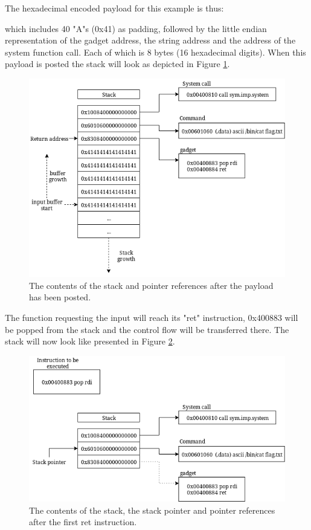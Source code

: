 \begin{enumerate}
The hexadecimal encoded payload for this example is thus:


which includes 40 "A"s (0x41) as padding, followed by the little endian representation of
the gadget address, the string address and the address of the system function call. Each
of which is 8 bytes (16 hexadecimal digits). When this payload is posted the stack will
look as depicted in Figure \ref{fig:after-payload}.

\begin{figure}[h]
	\centering
	\includegraphics[width=\textwidth]{background/software-diversity/figures/after-payload}
	\caption{The contents of the stack and pointer references after the payload has been posted.}
	\label{fig:after-payload}
\end{figure}

The function requesting the input will reach its "ret" instruction, 0x400883 will be popped
from the stack and the control flow will be transferred there. The stack will now look like
presented in Figure \ref{fig:after-first}.

\begin{figure}[h]
	\centering
	\includegraphics[width=\textwidth]{background/software-diversity/figures/after-first}
	\caption{The contents of the stack, the stack pointer and pointer references after the first ret instruction.}
	\label{fig:after-first}
\end{figure}


\end{enumerate}
